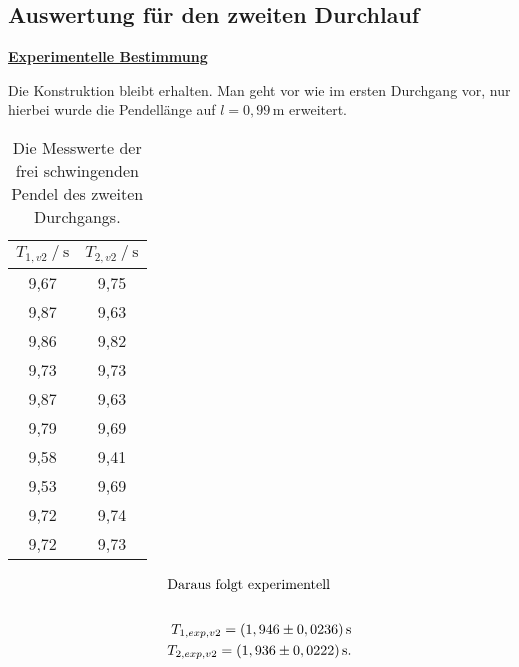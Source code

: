 \subsection{Auswertung für den zweiten Durchlauf}

\underline{\textbf{Experimentelle Bestimmung}}

\begin{flushleft}
    Die Konstruktion bleibt erhalten. Man geht vor wie im ersten Durchgang vor, nur hierbei wurde die Pendellänge auf $ l = 0,99\, \unit{\meter} $
    erweitert.
\end{flushleft}

\begin{table}[H]
    \centering
    \caption{Die Messwerte der frei schwingenden Pendel des zweiten Durchgangs.}
    \label{Tabelle5}
    \begin{tabular} {c  c}
        \toprule
        {$T_{1,v2} \mathbin{/} \unit{\second}$} &
        {$T_{2,v2} \mathbin{/} \unit{\second}$} \\
        \midrule
         9,67 & 9,75 \\
         9,87 & 9,63 \\
         9,86 & 9,82 \\
         9,73 & 9,73\\
         9,87 & 9,63 \\
         9,79 & 9,69 \\
         9,58 & 9,41 \\
         9,53 & 9,69 \\
         9,72 & 9,74 \\ 
         9,72 & 9,73 \\
        \bottomrule
    \end{tabular} 
\end{table} 

\begin{align*} 
    \intertext{Daraus folgt experimentell}\\
    T_{1,exp,v2} = (1,946 \pm 0,0236 )\, \unit{\second} \\
    T_{2,exp,v2} = (1,936 \pm 0,0222 )\, \unit{\second}.
\end{align*}


